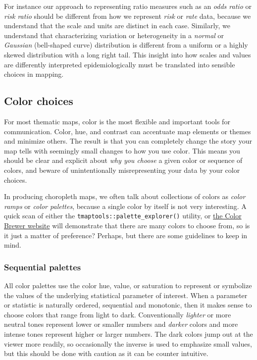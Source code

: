 \documentclass[
]{book}
\begin{document}
For instance our approach to representing ratio measures such as an \emph{odds ratio} or \emph{risk ratio} should be different from how we represent \emph{risk} or \emph{rate} data, because we understand that the scale and units are distinct in each case. Similarly, we understand that characterizing variation or heterogeneity in a \emph{normal} or \emph{Gaussian} (bell-shaped curve) distribution is different from a uniform or a highly skewed distribution with a long right tail. This insight into how scales and values are differently interpreted epidemiologically must be translated into sensible choices in mapping.

\hypertarget{color-choices}{%
\subsection{Color choices}\label{color-choices}}

For most thematic maps, color is the most flexible and important tools for communication. Color, hue, and contrast can accentuate map elements or themes and minimize others. The result is that you can completely change the story your map tells with seemingly small changes to how you use color. This means you should be clear and explicit about \emph{why you choose} a given color or sequence of colors, and beware of unintentionally misrepresenting your data by your color choices.

In producing choropleth maps, we often talk about collections of colors as \emph{color ramps} or \emph{color palettes}, because a single color by itself is not very interesting. A quick scan of either the \texttt{tmaptools::palette\_explorer()} utility, or \href{http://colorbrewer2.org/\#}{the Color Brewer website} will demonstrate that there are many colors to choose from, so is it just a matter of preference? Perhaps, but there are some guidelines to keep in mind.

\hypertarget{sequential-palettes}{%
\subsubsection{Sequential palettes}\label{sequential-palettes}}

All color palettes use the color hue, value, or saturation to represent or symbolize the values of the underlying statistical parameter of interest. When a parameter or statistic is naturally ordered, sequential and monotonic, then it makes sense to choose colors that range from light to dark. Conventionally \emph{lighter} or more neutral tones represent lower or smaller numbers and \emph{darker} colors and more intense tones represent higher or larger numbers. The dark colors jump out at the viewer more readily, so occasionally the inverse is used to emphasize small values, but this should be done with caution as it can be counter intuitive.
\end{document}
